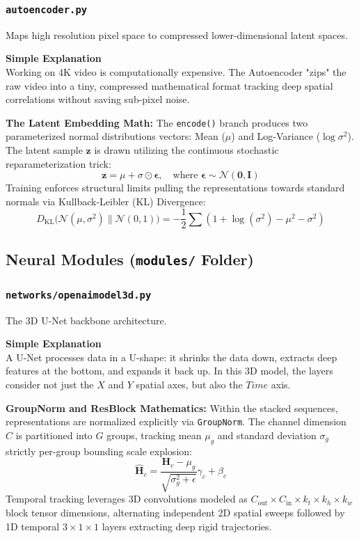 \documentclass[11pt,a4paper]{article}
\begin{document}
\subsubsection{\texttt{autoencoder.py}}
Maps high resolution pixel space to compressed lower-dimensional latent spaces.

\begin{simplebox}
\textbf{Simple Explanation} \\
Working on 4K video is computationally expensive. The Autoencoder "zips" the raw video into a tiny, compressed mathematical format tracking deep spatial correlations without saving sub-pixel noise.
\end{simplebox}

\textbf{The Latent Embedding Math:}
The \texttt{encode()} branch produces two parameterized normal distributions vectors: Mean ($\mu$) and Log-Variance ($\log \sigma^2$).
The latent sample $\mathbf{z}$ is drawn utilizing the continuous stochastic reparameterization trick:
\[ \mathbf{z} = \mu + \sigma \odot \mathbf{\epsilon}, \quad \text{where } \mathbf{\epsilon} \sim \mathcal{N}(\mathbf{0}, \mathbf{I}) \]
Training enforces structural limits pulling the representations towards standard normals via Kullback-Leibler (KL) Divergence:
\[ D_{\text{KL}}\big(\mathcal{N}(\mu, \sigma^2) \parallel \mathcal{N}(0, 1)\big) = -\frac{1}{2} \sum \left( 1 + \log(\sigma^2) - \mu^2 - \sigma^2 \right) \]

\subsection{Neural Modules (\texttt{modules/} Folder)}

\subsubsection{\texttt{networks/openaimodel3d.py}}
The 3D U-Net backbone architecture.
\begin{simplebox}
\textbf{Simple Explanation} \\
A U-Net processes data in a U-shape: it shrinks the data down, extracts deep features at the bottom, and expands it back up. In this 3D model, the layers consider not just the $X$ and $Y$ spatial axes, but also the $Time$ axis.
\end{simplebox}

\textbf{GroupNorm and ResBlock Mathematics:}
Within the stacked sequences, representations are normalized explicitly via \texttt{GroupNorm}. The channel dimension $C$ is partitioned into $G$ groups, tracking mean $\mu_g$ and standard deviation $\sigma_g$ strictly per-group bounding scale explosion:
\[ \hat{\mathbf{H}}_c = \frac{\mathbf{H}_c - \mu_g}{\sqrt{\sigma_g^2 + \epsilon}} \gamma_c + \beta_c \]
Temporal tracking leverages 3D convolutions modeled as $C_{\text{out}} \times C_{\text{in}} \times k_t \times k_h \times k_w$ block tensor dimensions, alternating independent 2D spatial sweeps followed by 1D temporal $3 \times 1 \times 1$ layers extracting deep rigid trajectories.
\end{document}
